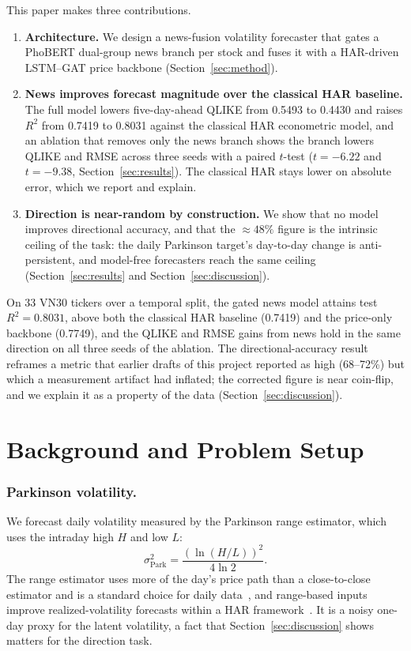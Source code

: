 \documentclass[runningheads]{llncs}
\newcommand{\qlikeHARc}{0.5493}
\newcommand{\rsqHARc}{0.7419}
\newcommand{\rsqBB}{0.7749}
\newcommand{\qlikeNews}{0.4430}
\newcommand{\rsqNews}{0.8031}
\newcommand{\qliketstat}{-6.22}
\newcommand{\rmsetstat}{-9.38}
\newcommand{\ntick}{33}
\begin{document}
This paper makes three contributions.
\begin{enumerate}
\item \textbf{Architecture.} We design a news-fusion volatility forecaster that gates a PhoBERT
dual-group news branch per stock and fuses it with a HAR-driven LSTM--GAT price backbone
(Section~\ref{sec:method}).
\item \textbf{News improves forecast magnitude over the classical HAR baseline.} The full model
lowers five-day-ahead QLIKE from \qlikeHARc{} to \qlikeNews{} and raises $R^2$ from \rsqHARc{} to
\rsqNews{} against the classical HAR econometric model, and an ablation that removes only the news
branch shows the branch lowers QLIKE and RMSE across three seeds with a paired $t$-test
($t=\qliketstat$ and $t=\rmsetstat$, Section~\ref{sec:results}). The classical HAR stays lower on
absolute error, which we report and explain.
\item \textbf{Direction is near-random by construction.} We show that no model improves directional
accuracy, and that the $\approx 48\%$ figure is the intrinsic ceiling of the task: the daily
Parkinson target's day-to-day change is anti-persistent, and model-free forecasters reach the same
ceiling (Section~\ref{sec:results} and Section~\ref{sec:discussion}).
\end{enumerate}

On \ntick{} VN30 tickers over a temporal split, the gated news model attains test $R^2=\rsqNews$,
above both the classical HAR baseline (\rsqHARc) and the price-only backbone (\rsqBB), and the QLIKE
and RMSE gains from news hold in the same direction on all three seeds of the ablation. The
directional-accuracy result reframes a metric that earlier drafts of this project reported as high
(68--72\%) but which a measurement artifact had inflated; the corrected figure is near coin-flip,
and we explain it as a property of the data (Section~\ref{sec:discussion}).

\section{Background and Problem Setup}
\label{sec:background}

\subsubsection{Parkinson volatility.}
We forecast daily volatility measured by the Parkinson range estimator, which uses the intraday
high $H$ and low $L$:
\begin{equation}
\sigma^2_{\text{Park}} = \frac{\left(\ln(H/L)\right)^2}{4\ln 2}.
\label{eq:parkinson}
\end{equation}
The range estimator uses more of the day's price path than a close-to-close estimator and is a
standard choice for daily data~\cite{parkinson1980}, and range-based inputs improve
realized-volatility forecasts within a HAR framework~\cite{korkusuz2023}. It is a noisy one-day
proxy for the latent volatility, a fact that Section~\ref{sec:discussion} shows matters for the
direction task.
\end{document}
